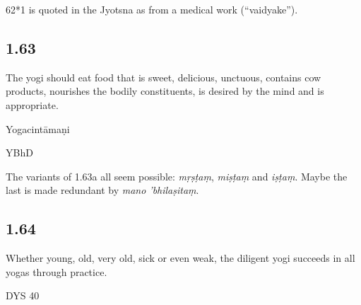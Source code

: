 \begin{ekdosis}
\begin{philcomm}[hp01_062]
62*1 is quoted in the Jyotsna as from a medical work (“vaidyake”).
\end{philcomm}

\subsection*{1.63}
\begin{translation}[hp01_063]
The yogi should eat food that is sweet, delicious, unctuous, contains cow products, nourishes the bodily constituents, is desired by the mind and is appropriate.
\end{translation}

\begin{sources}[hp01_063]
\end{sources}

\begin{testimonia}[hp01_063]
Yogacintāmaṇi

\begin{versinnote}
\end{versinnote}

YBhD

\begin{versinnote}
\end{versinnote}

\end{testimonia}

\begin{philcomm}[hp01_063]
The variants of 1.63a all seem possible: \emph{mṛṣṭaṃ}, \emph{miṣṭaṃ} and \emph{iṣṭaṃ}. Maybe the last is made redundant by \emph{mano 'bhilaṣitaṃ}.
\end{philcomm}

\subsection*{1.64}
\begin{translation}[hp01_064]
Whether young, old, very old, sick or even weak, the diligent yogi succeeds in all yogas through practice.
\end{translation}

\begin{sources}[hp01_064]
DYS 40


\end{sources}
\end{ekdosis}
